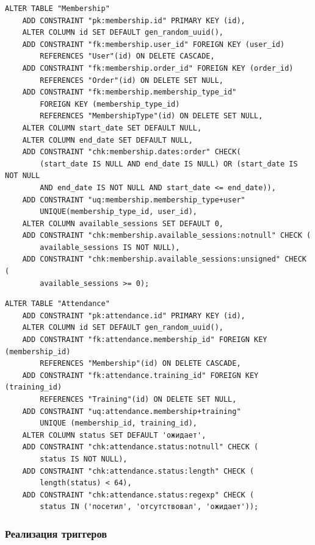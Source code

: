\begin{lstlisting}[label=alg:24, caption=Реализация  ограничений целостности данных отношения Membership, captionpos=t]
ALTER TABLE "Membership"
	ADD CONSTRAINT "pk:membership.id" PRIMARY KEY (id),
	ALTER COLUMN id SET DEFAULT gen_random_uuid(),
	ADD CONSTRAINT "fk:membership.user_id" FOREIGN KEY (user_id) 
		REFERENCES "User"(id) ON DELETE CASCADE,
	ADD CONSTRAINT "fk:membership.order_id" FOREIGN KEY (order_id) 
		REFERENCES "Order"(id) ON DELETE SET NULL,
	ADD CONSTRAINT "fk:membership.membership_type_id" 
		FOREIGN KEY (membership_type_id) 
		REFERENCES "MembershipType"(id) ON DELETE SET NULL,
	ALTER COLUMN start_date SET DEFAULT NULL,
	ALTER COLUMN end_date SET DEFAULT NULL,
	ADD CONSTRAINT "chk:membership.dates:order" CHECK(
		(start_date IS NULL AND end_date IS NULL) OR (start_date IS NOT NULL 
		AND end_date IS NOT NULL AND start_date <= end_date)),
	ADD CONSTRAINT "uq:membership.membership_type+user"
		UNIQUE(membership_type_id, user_id),
	ALTER COLUMN available_sessions SET DEFAULT 0,
	ADD CONSTRAINT "chk:membership.available_sessions:notnull" CHECK (
		available_sessions IS NOT NULL),
	ADD CONSTRAINT "chk:membership.available_sessions:unsigned" CHECK (
		available_sessions >= 0);
\end{lstlisting}

\begin{lstlisting}[label=alg:26, caption=Реализация  ограничений целостности данных отношения Attendance, captionpos=t]
ALTER TABLE "Attendance"
	ADD CONSTRAINT "pk:attendance.id" PRIMARY KEY (id),
	ALTER COLUMN id SET DEFAULT gen_random_uuid(),
	ADD CONSTRAINT "fk:attendance.membership_id" FOREIGN KEY (membership_id) 
		REFERENCES "Membership"(id) ON DELETE CASCADE,
	ADD CONSTRAINT "fk:attendance.training_id" FOREIGN KEY (training_id) 
		REFERENCES "Training"(id) ON DELETE SET NULL,
	ADD CONSTRAINT "uq:attendance.membership+training" 
		UNIQUE (membership_id, training_id),
	ALTER COLUMN status SET DEFAULT 'ожидает',
	ADD CONSTRAINT "chk:attendance.status:notnull" CHECK (
		status IS NOT NULL),
	ADD CONSTRAINT "chk:attendance.status:length" CHECK (
		length(status) < 64),
	ADD CONSTRAINT "chk:attendance.status:regexp" CHECK (
		status IN ('посетил', 'отсутствовал', 'ожидает'));
\end{lstlisting}

\subsubsection{Реализация триггеров}

